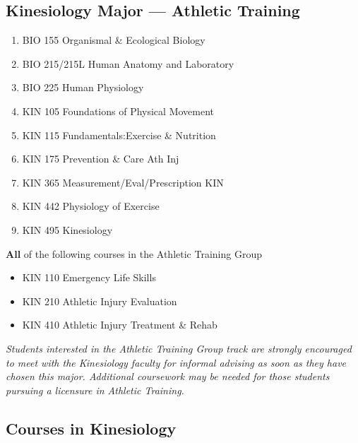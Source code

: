 \documentclass[
  letterpaper,
]{scrbook}
\providecommand{\tightlist}{%
  \setlength{\itemsep}{0pt}\setlength{\parskip}{0pt}}
\begin{document}
\subsection{Kinesiology Major --- Athletic
Training}\label{kinesiology-major-athletic-training}

\begin{enumerate}
\def\labelenumi{\arabic{enumi}.}
\tightlist
\item
  BIO 155 Organismal \& Ecological Biology
\item
  BIO 215/215L Human Anatomy and Laboratory
\item
  BIO 225 Human Physiology
\item
  KIN 105 Foundations of Physical Movement
\item
  KIN 115 Fundamentals:Exercise \& Nutrition
\item
  KIN 175 Prevention \& Care Ath Inj
\item
  KIN 365 Measurement/Eval/Prescription KIN
\item
  KIN 442 Physiology of Exercise
\item
  KIN 495 Kinesiology
\end{enumerate}

\textbf{All} of the following courses in the Athletic Training Group

\begin{itemize}
\tightlist
\item
  KIN 110 Emergency Life Skills
\item
  KIN 210 Athletic Injury Evaluation
\item
  KIN 410 Athletic Injury Treatment \& Rehab
\end{itemize}

\emph{Students interested in the Athletic Training Group track are
strongly encouraged to meet with the Kinesiology faculty for informal
advising as soon as they have chosen this major. Additional coursework
may be needed for those students pursuing a licensure in Athletic
Training. }

\subsection{Courses in Kinesiology}\label{courses-in-kinesiology}
\end{document}
